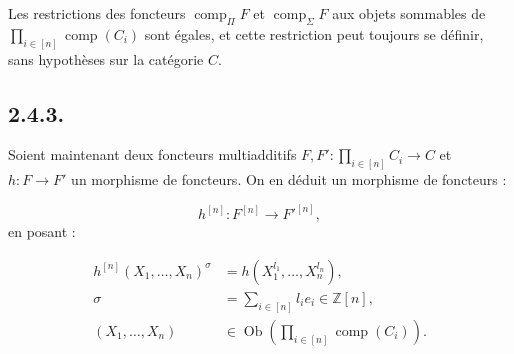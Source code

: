 Les restrictions des foncteurs $\operatorname{comp}_{\Pi}F$ et
$\operatorname{comp}_{\Sigma}F$ aux objets sommables de
$\prod_{i\in[n]}\operatorname{comp}(C_i)$ sont égales, et cette restriction
peut toujours se définir, sans hypothèses sur la catégorie $C$.

\subsection*{2.4.3.}
Soient maintenant deux foncteurs multiadditifs
$F,F'\colon\prod_{i\in[n]}C_i\longrightarrow C$ et
$h\colon F\longrightarrow F'$ un morphisme de foncteurs. On en déduit un
morphisme de foncteurs :

\begin{equation*}
  h^{[n]}\colon F^{[n]}\longrightarrow F'^{[n]},
\end{equation*}
en posant :

\begin{equation}
  \begin{aligned}
    h^{[n]}(X_1,\ldots,X_n)^{\sigma}
      &=h(X_1^{l_1},\ldots,X_n^{l_n}),\\
    \sigma&=\sum_{i\in[n]}l_i e_i\in\mathbb Z[n],\\
    (X_1,\ldots,X_n)&\in
      \operatorname{Ob}\!\left(\prod_{i\in[n]}\operatorname{comp}(C_i)\right).
  \end{aligned}
  \tag{2.4.3.1}
\end{equation}
